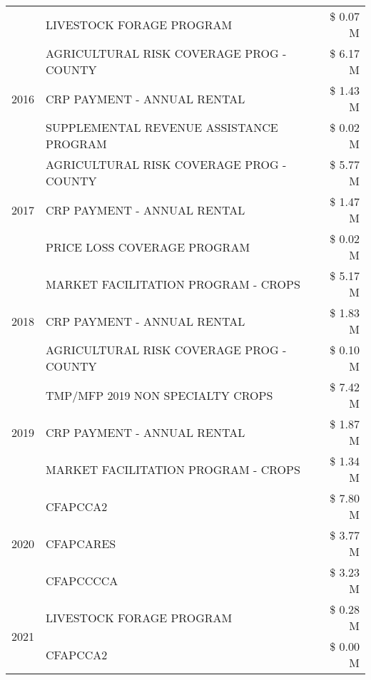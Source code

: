 \begin{tabular}{llr}
 & LIVESTOCK FORAGE PROGRAM & \$ 0.07 M \\
\cline{1-3}
\multirow[t]{3}{*}{2016} & AGRICULTURAL RISK COVERAGE PROG - COUNTY & \$ 6.17 M \\
 & CRP PAYMENT - ANNUAL RENTAL & \$ 1.43 M \\
 & SUPPLEMENTAL REVENUE ASSISTANCE PROGRAM & \$ 0.02 M \\
\cline{1-3}
\multirow[t]{3}{*}{2017} & AGRICULTURAL RISK COVERAGE PROG - COUNTY & \$ 5.77 M \\
 & CRP PAYMENT - ANNUAL RENTAL & \$ 1.47 M \\
 & PRICE LOSS COVERAGE PROGRAM & \$ 0.02 M \\
\cline{1-3}
\multirow[t]{3}{*}{2018} & MARKET FACILITATION PROGRAM - CROPS & \$ 5.17 M \\
 & CRP PAYMENT - ANNUAL RENTAL & \$ 1.83 M \\
 & AGRICULTURAL RISK COVERAGE PROG - COUNTY & \$ 0.10 M \\
\cline{1-3}
\multirow[t]{3}{*}{2019} & TMP/MFP 2019 NON SPECIALTY CROPS & \$ 7.42 M \\
 & CRP PAYMENT - ANNUAL RENTAL & \$ 1.87 M \\
 & MARKET FACILITATION PROGRAM - CROPS & \$ 1.34 M \\
\cline{1-3}
\multirow[t]{3}{*}{2020} & CFAPCCA2 & \$ 7.80 M \\
 & CFAPCARES & \$ 3.77 M \\
 & CFAPCCCCA & \$ 3.23 M \\
\cline{1-3}
\multirow[t]{2}{*}{2021} & LIVESTOCK FORAGE PROGRAM & \$ 0.28 M \\
 & CFAPCCA2 & \$ 0.00 M \\
\cline{1-3}
\bottomrule
\end{tabular}
